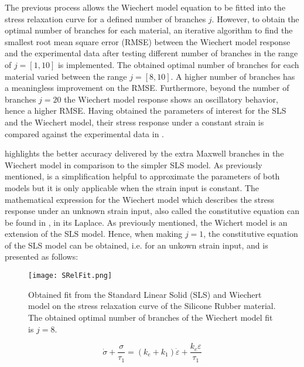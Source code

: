 The previous process allows the Wiechert model equation to be fitted into the stress relaxation curve for a defined number of branches $j$. However, to obtain the optimal number of branches for each material, an iterative algorithm to find the smallest root mean square error (RMSE) between the Wiechert model response and the experimental data after testing different number of branches in the range of $j=[1,10]$ is implemented. The obtained optimal number of branches for each material varied between the range $j=[8,10]$. A higher number of branches has a meaningless improvement on the RMSE. Furthermore, beyond the number of branches $j=20$ the Wiechert model response shows an oscillatory behavior, hence a higher RMSE. Having obtained the parameters of interest for the SLS and the Wiechert model, their stress response under a constant strain is compared against the experimental data in .

 highlights the better accuracy delivered by the extra Maxwell branches in the Wiechert model in comparison to the simpler SLS model. As previously mentioned,  is a simplification helpful to approximate the parameters of both models but it is only applicable when the strain input is constant. The mathematical expression for the Wiechert model which describes the stress response under an unknown strain input, also called the constitutive equation can be found in \cite{roylance2001engineering}, in its Laplace. 
As previously mentioned, the Wichert model is an extension of the SLS model. Hence, when making $j=1$, the constitutive equation of the SLS model can be obtained, i.e. for an unkown strain input, and is presented as follows:

\begin{figure}[htb!]
	\centering
    \texttt{[image: SRelFit.png]}
    \caption{Obtained fit from the Standard Linear Solid (SLS) and Wiechert model on the stress relaxation curve of the Silicone Rubber material. The obtained optimal number of branches of the Wiechert model fit is $j=8$.}
    \label{fig:StressRelFit}
\end{figure}

\begin{equation}
\label{eq3}
\dot{\sigma} + \frac{\sigma}{\tau_1} =  (k_e + k_1)\dot{\varepsilon} + \frac{k_e\varepsilon}{\tau_1}
\end{equation}

